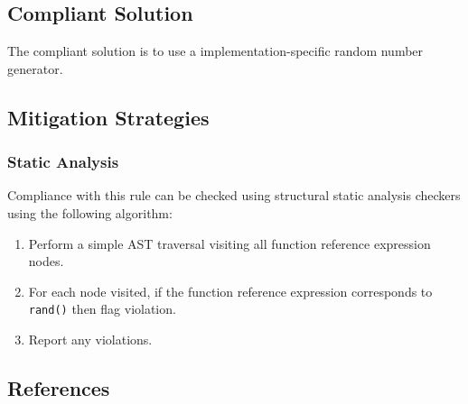\subsection{Compliant Solution}
The compliant solution is to use a implementation-specific random number generator.



\subsection{Mitigation Strategies}
\subsubsection{Static Analysis} 

Compliance with this rule can be checked using structural static analysis checkers using the following algorithm:

\begin{enumerate}
\item Perform a simple AST traversal visiting all function reference expression nodes.
\item For each node visited, if the function reference expression corresponds to {\tt rand()} then flag violation.
\item Report any violations. 
\end{enumerate}

\subsection{References}
